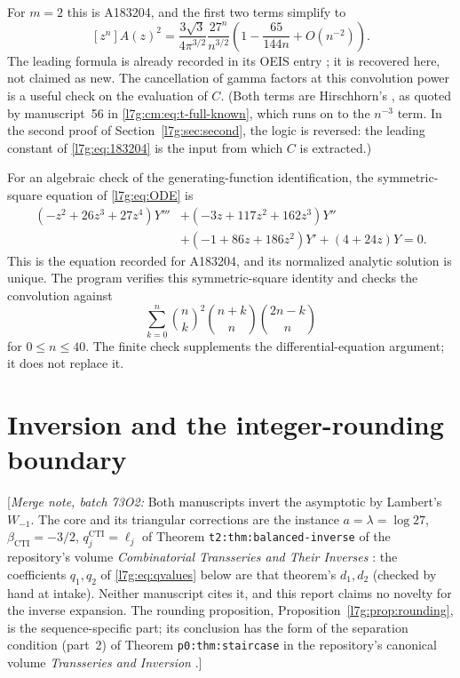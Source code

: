 \documentclass[11pt,letterpaper]{article}
\theoremstyle{remark}\newtheorem{remark}[theorem]{Remark}
\newcommand{\mergenote}[1]{\textup{[}\emph{Merge note, batch 73O2:} #1\textup{]}}
\newcounter{l7gtrsavedeq}
\begin{document}
For $m=2$ this is A183204, and the first two terms simplify to
\begin{equation}\label{l7g:eq:183204}
 [z^n]A(z)^2=
 \frac{3\sqrt3}{4\pi^{3/2}}\frac{27^n}{n^{3/2}}
 \left(1-\frac{65}{144n}+O(n^{-2})\right).
\end{equation}
The leading formula is already recorded in its OEIS entry
\cite{l7g:oeis183204}; it is recovered here, not claimed as new.
The cancellation of gamma factors at this convolution power is a useful
check on the evaluation of $C$. (Both terms are Hirschhorn's
\cite{l7g:hirschhorn}, as quoted by manuscript~56 in
\eqref{l7g:cm:eq:t-full-known}, which runs on to the $n^{-3}$ term. In the
second proof of Section~\ref{l7g:sec:second}, the logic is reversed: the
leading constant of \eqref{l7g:eq:183204} is the input from which $C$ is
extracted.)

For an algebraic check of the generating-function identification, the
symmetric-square equation of \eqref{l7g:eq:ODE} is
\begin{equation}\label{l7g:eq:squareODE}
\begin{split}
 (-z^2+26z^3+27z^4)Y'''&+(-3z+117z^2+162z^3)Y''\\
 &+(-1+86z+186z^2)Y'+(4+24z)Y=0.
\end{split}
\end{equation}
This is the equation recorded for A183204, and its normalized analytic
solution is unique. The program verifies this symmetric-square identity
and checks the convolution against
\[
 \sum_{k=0}^{n}\binom nk^2\binom{n+k}{n}\binom{2n-k}{n}
\]
for $0\le n\le40$. The finite check supplements the differential-equation
argument; it does not replace it.

\section{Inversion and the integer-rounding boundary}\label{l7g:sec:inversion}

\mergenote{Both manuscripts invert the asymptotic by Lambert's $W_{-1}$.
The core and its triangular corrections are the instance
$a=\lambda=\log27$, $\beta_{\mathrm{CTI}}=-3/2$, $q_j^{\mathrm{CTI}}=\ell_j$ of
Theorem \texttt{t2:thm:balanced-inverse} of the repository's volume
\emph{Combinatorial Transseries and Their Inverses} \cite{l7g:cti}: the
coefficients $q_1,q_2$ of \eqref{l7g:eq:qvalues} below are that theorem's
$d_1,d_2$ (checked by hand at intake). Neither manuscript cites it, and
this report claims no novelty for the inverse expansion. The rounding
proposition, Proposition~\ref{l7g:prop:rounding}, is the sequence-specific
part; its conclusion has the form of the separation condition (part~2) of
Theorem \texttt{p0:thm:staircase} in the repository's canonical volume
\emph{Transseries and Inversion} \cite{l7g:tai}.}
\end{document}
